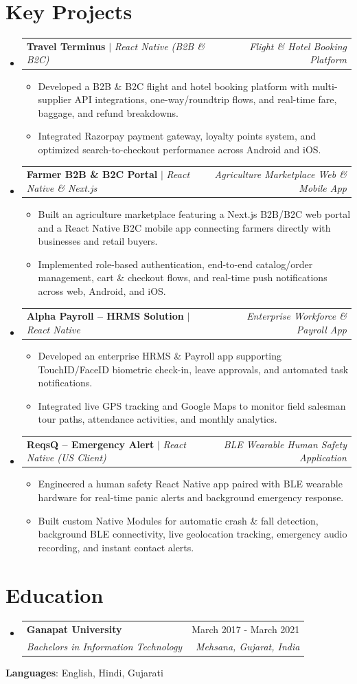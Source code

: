 \documentclass[letterpaper,10.5pt]{article}
\makeatletter
\newcommand{\resumeItem}[1]{
  \item\small{
    {#1 \vspace{-2pt}}
  }
}
\newcommand{\resumeSubheading}[4]{
  \vspace{-1pt}\item
    \begin{tabular*}{0.99\textwidth}[t]{l@{\extracolsep{\fill}}r}
      \textbf{#1} & \small #2 \\
      \textit{\small#3} & \textit{\small #4} \\
    \end{tabular*}\vspace{-6pt}
}
\newcommand{\resumeProjectHeading}[2]{
  \item
    \begin{tabular*}{0.99\textwidth}{l@{\extracolsep{\fill}}r}
      \small#1 & \textit{\small #2} \\
    \end{tabular*}\vspace{-6pt}
}
\newcommand{\resumeSubHeadingListStart}{\begin{itemize}[leftmargin=0.0in, label={}]}
\newcommand{\resumeSubHeadingListEnd}{\end{itemize}}
\newcommand{\resumeItemListStart}{\begin{itemize}[leftmargin=0.16in]}
\newcommand{\resumeItemListEnd}{\end{itemize}\vspace{-4pt}}
\makeatother
\begin{document}
\section{Key Projects}
\resumeSubHeadingListStart
\resumeProjectHeading
  {\textbf{Travel Terminus} $|$ \emph{React Native (B2B \& B2C)}}{Flight \& Hotel Booking Platform}
  \resumeItemListStart
    \resumeItem{Developed a B2B \& B2C flight and hotel booking platform with multi-supplier API integrations, one-way/roundtrip flows, and real-time fare, baggage, and refund breakdowns.}
    \resumeItem{Integrated Razorpay payment gateway, loyalty points system, and optimized search-to-checkout performance across Android and iOS.}
  \resumeItemListEnd

\resumeProjectHeading
  {\textbf{Farmer B2B \& B2C Portal} $|$ \emph{React Native \& Next.js}}{Agriculture Marketplace Web \& Mobile App}
  \resumeItemListStart
    \resumeItem{Built an agriculture marketplace featuring a Next.js B2B/B2C web portal and a React Native B2C mobile app connecting farmers directly with businesses and retail buyers.}
    \resumeItem{Implemented role-based authentication, end-to-end catalog/order management, cart \& checkout flows, and real-time push notifications across web, Android, and iOS.}
  \resumeItemListEnd

\resumeProjectHeading
  {\textbf{Alpha Payroll -- HRMS Solution} $|$ \emph{React Native}}{Enterprise Workforce \& Payroll App}
  \resumeItemListStart
    \resumeItem{Developed an enterprise HRMS \& Payroll app supporting TouchID/FaceID biometric check-in, leave approvals, and automated task notifications.}
    \resumeItem{Integrated live GPS tracking and Google Maps to monitor field salesman tour paths, attendance activities, and monthly analytics.}
  \resumeItemListEnd

\resumeProjectHeading
  {\textbf{ReqsQ -- Emergency Alert} $|$ \emph{React Native (US Client)}}{BLE Wearable Human Safety Application}
  \resumeItemListStart
    \resumeItem{Engineered a human safety React Native app paired with BLE wearable hardware for real-time panic alerts and background emergency response.}
    \resumeItem{Built custom Native Modules for automatic crash \& fall detection, background BLE connectivity, live geolocation tracking, emergency audio recording, and instant contact alerts.}
  \resumeItemListEnd
\resumeSubHeadingListEnd
\vspace{-6pt}

\section{Education}
\resumeSubHeadingListStart
\resumeSubheading
  {Ganapat University}{March 2017 - March 2021}
  {Bachelors in Information Technology}{Mehsana, Gujarat, India}
\resumeSubHeadingListEnd
\vspace{-6pt}
\small{\noindent\textbf{Languages}: English, Hindi, Gujarati}
\end{document}
